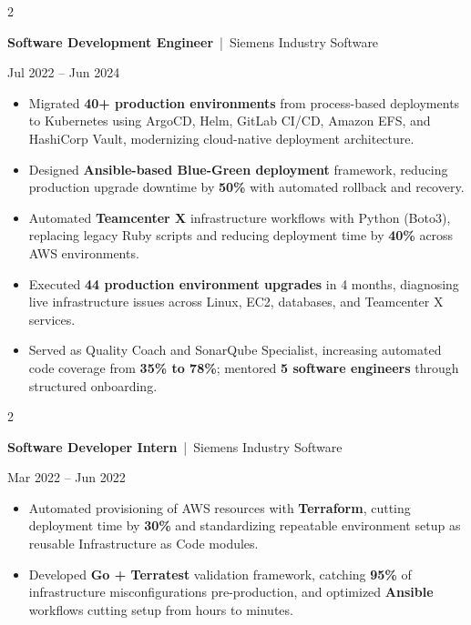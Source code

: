 \documentclass[10pt, letterpaper]{article}
\newenvironment{highlights}{
    \begin{itemize}[
        topsep=0.10 cm,
        parsep=0.06 cm,
        partopsep=0pt,
        itemsep=0.06 cm,
        leftmargin=12pt
    ]
}{
    \end{itemize}
}
\newenvironment{twocolentry}[2][]{
    \onecolentry
    \def\secondColumn{#2}
    \setcolumnwidth{\fill, 4.5 cm}
    \begin{paracol}{2}
}{
    \switchcolumn \raggedleft \secondColumn
    \end{paracol}
    \endonecolentry
}
\begin{document}
\vspace{0.15 cm}

\begin{twocolentry}{Jul 2022 -- Jun 2024}
\textbf{Software Development Engineer} \,|\, Siemens Industry Software
\end{twocolentry}
\begin{highlights}
  \item Migrated \textbf{40+ production environments} from process-based deployments to Kubernetes using ArgoCD, Helm, GitLab CI/CD, Amazon EFS, and HashiCorp Vault, modernizing cloud-native deployment architecture.
  \item Designed \textbf{Ansible-based Blue-Green deployment} framework, reducing production upgrade downtime by \textbf{50\%} with automated rollback and recovery.
  \item Automated \textbf{Teamcenter X} infrastructure workflows with Python (Boto3), replacing legacy Ruby scripts and reducing deployment time by \textbf{40\%} across AWS environments.
  \item Executed \textbf{44 production environment upgrades} in 4 months, diagnosing live infrastructure issues across Linux, EC2, databases, and Teamcenter X services.
  \item Served as Quality Coach and SonarQube Specialist, increasing automated code coverage from \textbf{35\% to 78\%}; mentored \textbf{5 software engineers} through structured onboarding.
\end{highlights}

\vspace{0.15 cm}

\begin{twocolentry}{Mar 2022 -- Jun 2022}
\textbf{Software Developer Intern} \,|\, Siemens Industry Software
\end{twocolentry}
\begin{highlights}
  \item Automated provisioning of AWS resources with \textbf{Terraform}, cutting deployment time by \textbf{30\%} and standardizing repeatable environment setup as reusable Infrastructure as Code modules.
  \item Developed \textbf{Go + Terratest} validation framework, catching \textbf{95\%} of infrastructure misconfigurations pre-production, and optimized \textbf{Ansible} workflows cutting setup from hours to minutes.
\end{highlights}

\end{document}
